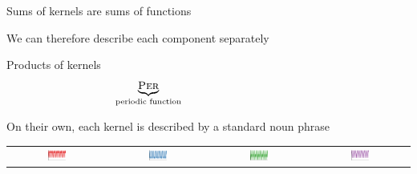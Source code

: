 \begin{frame}{Sums of kernels are sums of functions}
\vspace{\baselineskip}

We can therefore describe each component separately

\end{frame}

\begin{frame}{Products of kernels}
  \begin{align*}
    \phantom{\underbrace{\kSE}_{\textnormal{\scriptsize approximately}} \times }
    \underbrace{\kPer}_{\textnormal{\scriptsize periodic function}} \phantom{\times 
    \underbrace{\kLin}_{\textnormal{\scriptsize with linearly growing amplitude}} \times 
    \underbrace{\boldsymbol{\sigma}}_{\textnormal{\scriptsize until 1700}}}
  \end{align*}
  
  \vspace{\baselineskip}
  
  On their own, each kernel is described by a standard noun phrase
  
  \vspace{\baselineskip}
  
  \begin{block}{}
    \begin{tabular}{cccc}
      \includegraphics[width=0.2\textwidth]{figures/trans_samples/draw_11} &
      \includegraphics[width=0.2\textwidth]{figures/trans_samples/draw_12} &
      \includegraphics[width=0.2\textwidth]{figures/trans_samples/draw_13} &
      \includegraphics[width=0.2\textwidth]{figures/trans_samples/draw_14}
    \end{tabular}
  \end{block}
\end{frame}

